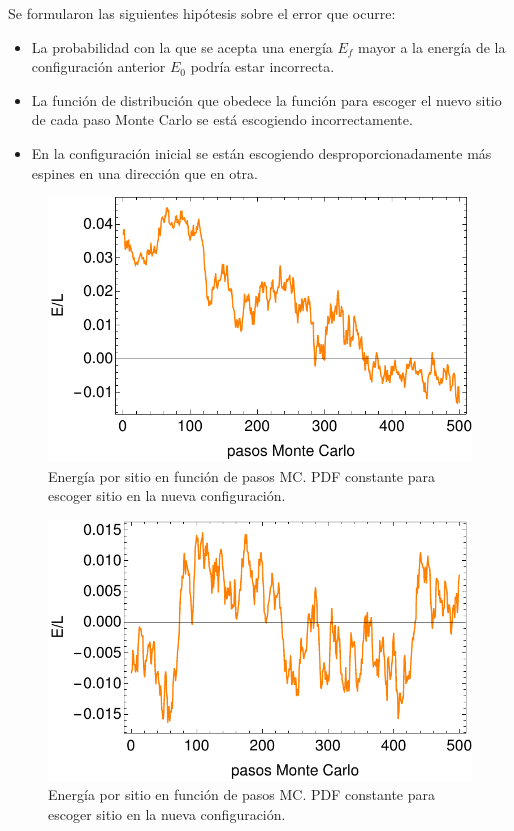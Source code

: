 \documentclass[letterpaper,superscriptaddress,aps,pra,nolongbibliography,twocolumn,showpacs,floatfix,10pt]{revtex4-2} %
\renewcommand{\>}{\rangle}
\newcommand{\<}{\langle}
\begin{document}
Se formularon las siguientes hipótesis sobre el error que ocurre:
\begin{itemize}
\item La probabilidad con la que se acepta una energía $E_f$ mayor 
a la energía de la configuración anterior $E_0$ podría estar incorrecta.
\item La función de distribución que obedece la función para escoger
el nuevo sitio de cada paso Monte Carlo se está escogiendo incorrectamente.
\item En la configuración inicial se están escogiendo desproporcionadamente
más espines en una dirección que en otra.
\end{itemize}

\begin{figure}
\centering
\includegraphics[width=0.9\columnwidth]{intento_001}
\caption{Energía por sitio en función de pasos MC. PDF constante
 para escoger sitio en la nueva configuración.}
\end{figure}

\begin{figure}
\includegraphics[width=0.9\columnwidth]{intento_002}
\caption{Energía por sitio en función de pasos MC. PDF constante
para escoger sitio en la nueva configuración.}
\end{figure}
\end{document}
